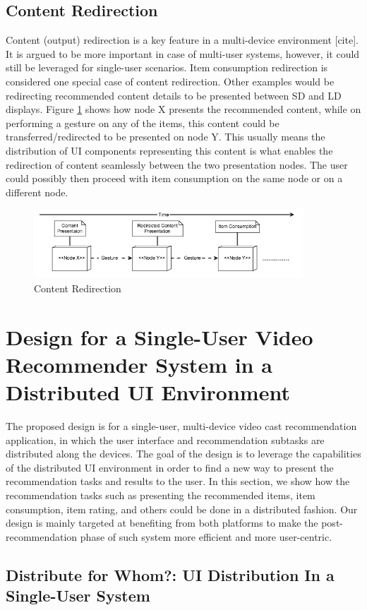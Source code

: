 \subsection{Content Redirection}
Content (output) redirection is a key feature in a multi-device environment [cite]. It is argued to be more important in case of multi-user systems, however, it could still be leveraged for single-user scenarios. Item consumption redirection is considered one special case of content redirection. Other examples would be redirecting recommended content details to be presented between SD and LD displays. Figure \ref{fig:figure35} shows how node X presents the recommended content, while on performing a gesture on any of the items, this content could be transferred/redirected to be presented on node Y. This usually means the distribution of UI components representing this content is what enables the redirection of content seamlessly between the two presentation nodes. The user could possibly then proceed with item consumption on the same node or on a different node.   
\begin{figure}[h!]
\includegraphics[width=0.9\textwidth, inner, center]{generic5}
\caption{Content Redirection}
\label{fig:figure35}
\end{figure}
\section{Design for a Single-User Video Recommender System in a Distributed UI Environment}
The proposed design is for a single-user, multi-device video cast recommendation application, in which the user interface and recommendation subtasks are distributed along the devices. The goal of the design is to leverage the capabilities of the distributed UI environment in order to find a new way to present the recommendation tasks and results to the user. In this section, we show how the recommendation tasks such as presenting the recommended items, item consumption, item rating, and others could be done in a distributed fashion. Our design is mainly targeted at benefiting from both platforms to make the post-recommendation phase of such system more efficient and more user-centric.
\subsection{Distribute for Whom?: UI Distribution In a Single-User System}

